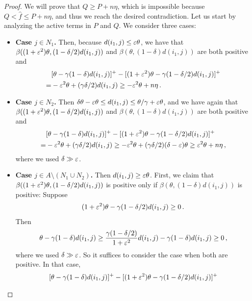 \begin{proof}
We will prove that $Q \geq P + n \eta$, which is impossible because $Q < \hat f \leq P + n \eta$, and thus we reach the desired contradiction.
Let us start by analyzing the active terms in $P$ and $Q$.
We consider three cases:
\begin{itemize}
    \item \textbf{Case $j \in N_1$.} 
    Then, because $d(i_1, j) \leq \varepsilon \theta$, we have that $\beta((1+\varepsilon^2)\theta, (1-\delta/2)d(i_1,j))$ and $\beta(\theta,(1-\delta)d(i_1,j))$ are both positive and
    \begin{align*}
    &[\theta - \gamma(1-\delta)d(i_1,j)]^+ - [(1+\varepsilon^2)\theta - \gamma(1-\delta/2)d(i_1,j)]^+\\
    =& -\varepsilon^2 \theta + (\gamma \delta / 2) d(i_1, j)
    \geq -\varepsilon^2 \theta + n \eta\,.
    \end{align*}
    \item \textbf{Case $j \in N_2$.}
    Then $\delta \theta - \varepsilon \theta \leq d(i_1, j) \leq \theta / \gamma + \varepsilon \theta$, and we have again that $\beta((1+\varepsilon^2)\theta, (1-\delta/2)d(i_1,j))$ and $\beta(\theta,(1-\delta)d(i_1,j))$ are both positive and 
    \begin{align*}
    &[\theta - \gamma(1-\delta)d(i_1,j)]^+ - [(1+\varepsilon^2)\theta - \gamma(1-\delta/2)d(i_1,j)]^+\\
    =& -\varepsilon^2 \theta + (\gamma \delta / 2) d(i_1, j)
    \geq -\varepsilon^2 \theta + (\gamma \delta / 2)(\delta-\varepsilon)\theta
    \geq \varepsilon^2 \theta + n\eta\,,
    \end{align*}
    where we used $\delta \gg \varepsilon$.
    \item \textbf{Case $j \in A \setminus (N_1 \cup N_2)$.}
    Then $d(i_1, j) \geq \varepsilon \theta$.
    First, we claim that $\beta((1+\varepsilon^2)\theta, (1-\delta/2)d(i_1,j))$ is positive only if $\beta(\theta,(1-\delta)d(i_1,j))$ is positive:
    Suppose
    \[(1+\varepsilon^2)\theta - \gamma(1-\delta/2)d(i_1, j) \geq 0\,.\]
    Then
    \begin{align*}
    \theta - \gamma (1-\delta) d(i_1, j)
    \geq \frac{\gamma(1-\delta/2)}{1+\varepsilon^2}d(i_1,j)-\gamma(1-\delta)d(i_1,j) \geq 0\,,
    \end{align*}
    where we used $\delta \gg \varepsilon$.
    So it suffices to consider the case when both are positive.
    In that case,
    \begin{align*}
    &[\theta - \gamma(1-\delta)d(i_1,j)]^+ - [(1+\eps^2)\theta - \gamma(1-\delta/2)d(i_1,j)]^+\\

\end{align*}
\end{itemize}
\end{proof}
